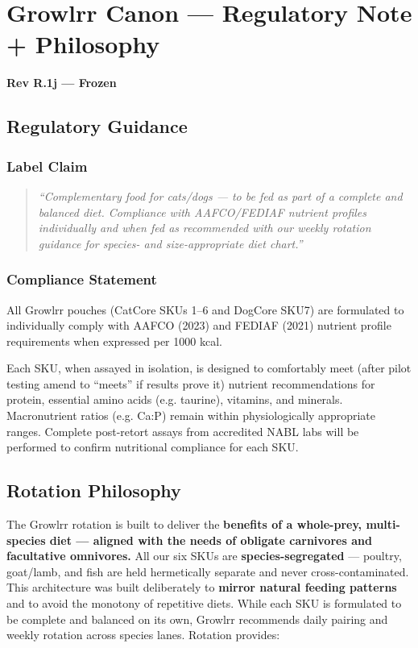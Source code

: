 
\section*{Growlrr Canon --- Regulatory Note + Philosophy}

\textbf{Rev R.1j --- Frozen}

\subsection*{Regulatory Guidance}

\subsubsection*{Label Claim}

\begin{quote}
\textit{``Complementary food for cats/dogs --- to be fed as part of a complete and balanced diet. Compliance with AAFCO/FEDIAF nutrient profiles individually and when fed as recommended with our weekly rotation guidance for species- and size-appropriate diet chart.''}
\end{quote}

\subsubsection*{Compliance Statement}

All Growlrr pouches (CatCore SKUs 1--6 and DogCore SKU7) are formulated to individually comply with AAFCO (2023) and FEDIAF (2021) nutrient profile requirements when expressed per 1000 kcal.

Each SKU, when assayed in isolation, is designed to comfortably meet (after pilot testing amend to ``meets'' if results prove it) nutrient recommendations for protein, essential amino acids (e.g. taurine), vitamins, and minerals. Macronutrient ratios (e.g. Ca:P) remain within physiologically appropriate ranges. Complete post-retort assays from accredited NABL labs will be performed to confirm nutritional compliance for each SKU.

\subsection*{Rotation Philosophy}

The Growlrr rotation is built to deliver the \textbf{benefits of a whole-prey, multi-species diet\cite{ref3,web85} --- aligned with the needs of obligate carnivores and facultative omnivores.} All our six SKUs are \textbf{species-segregated} --- poultry, goat/lamb, and fish are held hermetically separate and never cross-contaminated. This architecture was built deliberately to \textbf{mirror natural feeding patterns} and to avoid the monotony of repetitive diets. While each SKU is formulated to be complete and balanced on its own, Growlrr recommends daily pairing and weekly rotation across species lanes. Rotation provides:

